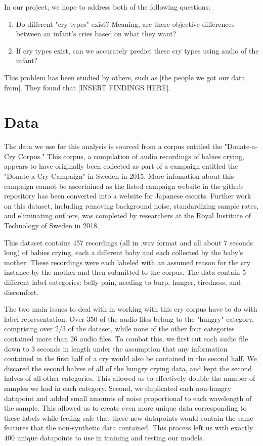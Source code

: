 \documentclass[10pt,letterpaper]{article}
\begin{document}
In our project, we hope to address both of the following questions:
\begin{enumerate}
   \item Do different "cry types" exist? Meaning, are there objective differences between an infant's cries based on what they want?
   \item If cry types exist, can we accurately predict these cry types using audio of the infant?
\end{enumerate}

This problem has been studied by others, such as [the people we got our data from].
They found that [INSERT FINDINGS HERE].


\section{Data}
The data we use for this analysis is sourced from a corpus entitled
the "Donate-a-Cry Corpus."
This corpus, a compilation of audio recordings of babies crying, appears to have originally been collected as part of a campaign entitled the "Donate-a-Cry Campaign" in Sweden in 2015.
More infomation about this campaign cannot be ascertained as the listed campaign website in the github repository has been converted into a website for Japanese escorts.
Further work on this dataset, including removing background noise, standardizing sample rates, and eliminating outliers, was completed by researchers at the Royal Institute of Technology of Sweden in 2018.

This dataset contains 457 recordings (all in .wav format and all about 7 seconds long) of babies crying, each a different baby and each collected by the baby's mother.
These recordings were each labeled with an assumed reason for the cry instance by the mother and then submitted to the corpus.
The data contain 5 different label categories: belly pain, needing to burp, hunger, tiredness, and discomfort.

The two main issues to deal with in working with this cry corpus have to do with label representation.
Over 350 of the audio files belong to the "hungry" category, comprising over $2/3$ of the dataset, while none of the other four categories contained more than 26 audio files.
To combat this, we first cut each audio file down to 3 seconds in length under the assumption that any information contained in the first half of a cry would also be contained in the second half.
We discared the second halves of all of the hungry crying data, and kept the second halves of all other categories.
This allowed us to effectively double the number of samples we had in each category.
Second, we duplicated each non-hungry datapoint and added small amounts of noise proportional to each wavelength of the sample.
This allowed us to create even more unique data corresponding to these labels while feeling safe that these new datapoints would contain the same features that the non-synthetic data contained.
This process left us with exactly 400 unique datapoints to use in training and testing our models.
\end{document}
